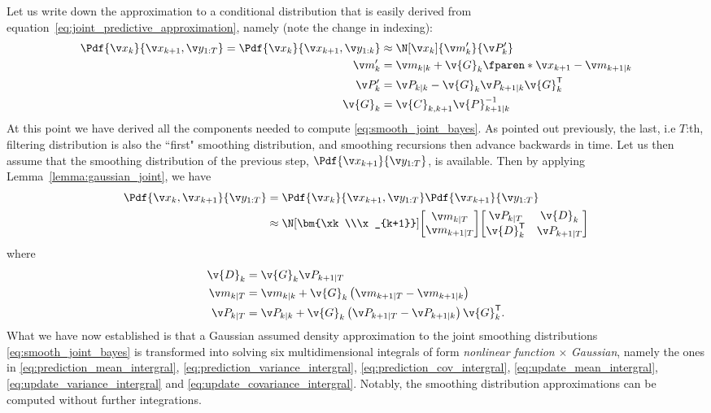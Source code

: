Let us write down the approximation to a 
conditional distribution that is easily derived from equation~\eqref{eq:joint_predictive_approximation}, 
namely (note the change in indexing):
\begin{align}
	\Pdf{\xk}{\x_{k+1},\y_{1:T}}=\Pdf{\xk}{\x_{k+1},\y_{1:k}}&\approx \N[\xk]{\m'_{k}}{\P'_{k}}\\
	\m'_{k} &= \m_{k|k}+\v{G}_k\fparen*{\x_{k+1}-\m_{k+1|k}}\\
	\P'_{k} &= \P_{k|k}-\v{G}_k\P_{k+1|k}\v{G}_k^\tr\\
	\v{G}_k &= \v{C}_{k,k+1}\v{P}_{k+1|k}^{-1}
	\label{eq:middle_conditional}
\end{align}
At this point we have derived all the components needed to compute
\eqref{eq:smooth_joint_bayes}. As pointed out previously, the last, i.e $T$:th, filtering 
distribution is also the ``first" smoothing distribution, and smoothing recursions
then advance backwards in time. Let us then assume that the smoothing
distribution of the previous step, $\Pdf{\x_{k+1}}{\y_{1:T}}$, is available. Then
by applying Lemma~\ref{lemma:gaussian_joint}, we have
\begin{align}
\begin{split}
	\Pdf{\xk,\x_{k+1}}{\y_{1:T}}&=\Pdf{\xk}{\x_{k+1},\y_{1:T}}\Pdf{\x_{k+1}}{\y_{1:T}}\\
	&\approx
	\N[\bm{\xk\\\x_{k+1}}]{
	\begin{bmatrix}
		\m_{k|T}\\
		\m_{k+1|T}
	\end{bmatrix}}{
	\begin{bmatrix}
		\P_{k|T}&\v{D}_{k}\\
		\v{D}_{k}^\tr&\P_{k+1|T}
	\end{bmatrix}
	}
\end{split}
\end{align}
where
\begin{align}
	\v{D}_{k}&=\v{G}_{k}\P_{k+1|T}\\
	\m_{k|T}&=\m_{k|k}+\v{G}_{k}\left(\m_{k+1|T}-\m_{k+1|k}\right)\\
	\P_{k|T}&=\P_{k|k}+\v{G}_{k}\left(\P_{k+1|T}-\P_{k+1|k}\right)\v{G}_{k}^\tr.
\end{align}%
%
What we have now established is that a Gaussian assumed density approximation to the joint 
smoothing distributions \eqref{eq:smooth_joint_bayes} is transformed into solving six
multidimensional integrals of form \emph{nonlinear function} $\times$ \emph{Gaussian}, 
namely the ones in
\eqref{eq:prediction_mean_intergral}, \eqref{eq:prediction_variance_intergral}, \eqref{eq:prediction_cov_intergral},
\eqref{eq:update_mean_intergral}, \eqref{eq:update_variance_intergral} and
\eqref{eq:update_covariance_intergral}. 
Notably, the smoothing distribution approximations can be computed
without further integrations.


